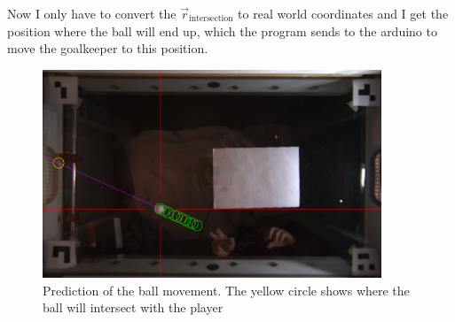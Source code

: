Now I only have to convert the $\vec{r}_\text{intersection}$ to real world coordinates and I get the position where the ball will end up, which the program sends to the arduino to move the goalkeeper to this position.
\begin{figure}[H]
    \centering
    \includegraphics[width=0.9\textwidth]{../photos/ball_prediction2}
    \caption[ball-detection]{Prediction of the ball movement. The yellow circle shows where the ball will intersect with the player}
    \label{fig:ball-prediction}
\end{figure}

%
%
%



